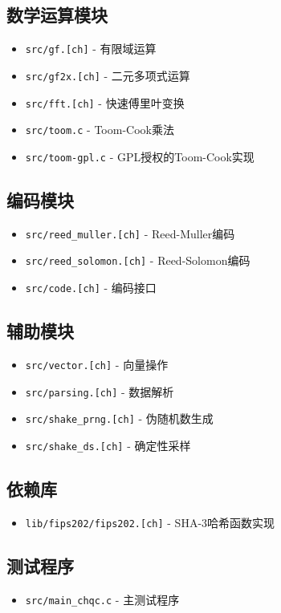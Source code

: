 \documentclass[zihao=-4,fontset=fandol,linespread=1.5]{ctexart}
\begin{document}
\subsection{数学运算模块}
\begin{itemize}
    \item \texttt{src/gf.[ch]} - 有限域运算
    \item \texttt{src/gf2x.[ch]} - 二元多项式运算
    \item \texttt{src/fft.[ch]} - 快速傅里叶变换
    \item \texttt{src/toom.c} - Toom-Cook乘法
    \item \texttt{src/toom-gpl.c} - GPL授权的Toom-Cook实现
\end{itemize}

\subsection{编码模块}  
\begin{itemize}
    \item \texttt{src/reed\_muller.[ch]} - Reed-Muller编码
    \item \texttt{src/reed\_solomon.[ch]} - Reed-Solomon编码
    \item \texttt{src/code.[ch]} - 编码接口
\end{itemize}

\subsection{辅助模块}
\begin{itemize}
    \item \texttt{src/vector.[ch]} - 向量操作
    \item \texttt{src/parsing.[ch]} - 数据解析
    \item \texttt{src/shake\_prng.[ch]} - 伪随机数生成
    \item \texttt{src/shake\_ds.[ch]} - 确定性采样
\end{itemize}

\subsection{依赖库}
\begin{itemize}
    \item \texttt{lib/fips202/fips202.[ch]} - SHA-3哈希函数实现
\end{itemize}

\subsection{测试程序}
\begin{itemize}
    \item \texttt{src/main\_chqc.c} - 主测试程序 
\end{itemize}
\end{document}
